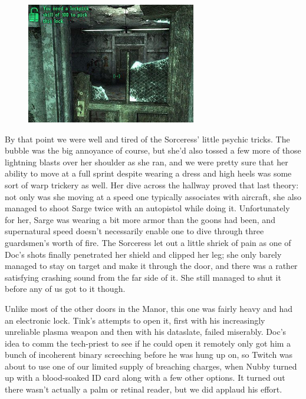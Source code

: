 \begin{figure}
	\begin{center}
		\includegraphics[width=\figwidth]{pics/18/60.png}
	\end{center}
\end{figure}
By that point we were well and tired of the Sorceress' little psychic tricks. 
The bubble was the big annoyance of course, but she'd also tossed a few more of those lightning blasts over her shoulder as she ran, and we were pretty sure that her ability to move at a full sprint despite wearing a dress and high heels was some sort of warp trickery as well. 
Her dive across the hallway proved that last theory: 
not only was she moving at a speed one typically associates with aircraft, she also managed to shoot Sarge twice with an autopistol while doing it. 
Unfortunately for her, Sarge was wearing a bit more armor than the goons had been, and supernatural speed doesn't necessarily enable one to dive through three guardsmen's worth of fire. 
The Sorceress let out a little shriek of pain as one of Doc's shots finally penetrated her shield and clipped her leg; 
she only barely managed to stay on target and make it through the door, and there was a rather satisfying crashing sound from the far side of it. 
She still managed to shut it before any of us got to it though.

Unlike most of the other doors in the Manor, this one was fairly heavy and had an electronic lock. 
Tink's attempts to open it, first with his increasingly unreliable plasma weapon and then with his dataslate, failed miserably. 
Doc's idea to comm the tech-priest to see if he could open it remotely only got him a bunch of incoherent binary screeching before he was hung up on, so Twitch was about to use one of our limited supply of breaching charges, when Nubby turned up with a blood-soaked ID card along with a few other options. 
It turned out there wasn't actually a palm or retinal reader, but we did applaud his effort. 


